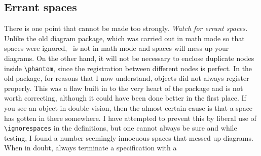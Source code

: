 \documentclass[12pt]{article}
\begin{document}
\subsection{Errant spaces}
 There is one point that cannot be made too strongly.  {\em Watch for
errant spaces.} Unlike the old diagram package, which was carried out in
math mode so that spaces were ignored, \xypic\ is not in math mode and
spaces will mess up your diagrams.  On the other hand, it will not be
necessary to enclose duplicate nodes inside
\verb.\phantom., since the
registration between different nodes is perfect.  In the old package,
for reasons that I now understand, objects did not always register
properly.  This was a flaw built in to the very heart of the package and
is not worth correcting, although it could have been done better in the
first place.  If you see an object in double vision, then the almost
certain cause is that a space has gotten in there somewhere.  I have
attempted to prevent this by liberal use of
\verb.\ignorespaces.  in the
definitions, but one cannot always be sure and while testing, I found a
number seemingly innocuous spaces that messed up diagrams.  When in
doubt, always terminate a specification with a
\end{document}
